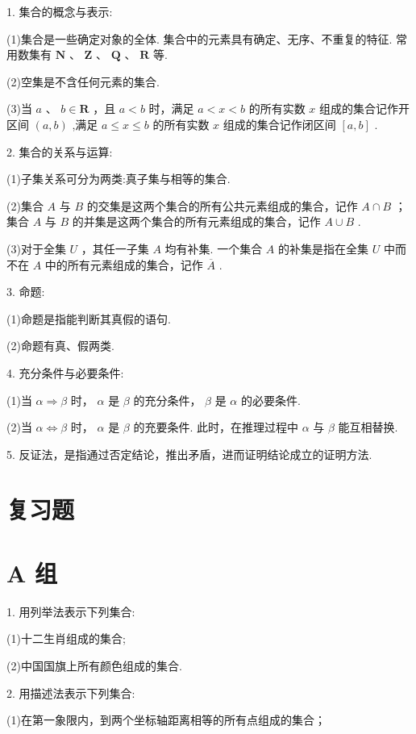 \documentclass[10pt]{article}
\begin{document}
1. 集合的概念与表示:

(1)集合是一些确定对象的全体. 集合中的元素具有确定、无序、不重复的特征. 常用数集有 \(\mathbf{N}\text{ 、 }\mathbf{Z}\text{ 、 }\mathbf{Q}\text{ 、 }\mathbf{R}\) 等.

(2)空集是不含任何元素的集合.

(3)当 \(a\text{ 、 }b \in  \mathbf{R}\) ，且 \(a < b\) 时，满足 \(a < x < b\) 的所有实数 \(x\) 组成的集合记作开区间 \(\left( {a,b}\right)\) ,满足 \(a \leq  x \leq  b\) 的所有实数 \(x\) 组成的集合记作闭区间 \(\left\lbrack  {a,b}\right\rbrack\) .

2. 集合的关系与运算:

(1)子集关系可分为两类:真子集与相等的集合.

(2)集合 \(A\) 与 \(B\) 的交集是这两个集合的所有公共元素组成的集合，记作 \(A \cap  B\) ；集合 \(A\) 与 \(B\) 的并集是这两个集合的所有元素组成的集合，记作 \(A \cup  B\) .

(3)对于全集 \(U\) ，其任一子集 \(A\) 均有补集. 一个集合 \(A\) 的补集是指在全集 \(U\) 中而不在 \(A\) 中的所有元素组成的集合，记作 \(\overline{A}\) .

3. 命题:

(1)命题是指能判断其真假的语句.

(2)命题有真、假两类.

4. 充分条件与必要条件:

(1)当 \(\alpha  \Rightarrow  \beta\) 时， \(\alpha\) 是 \(\beta\) 的充分条件， \(\beta\) 是 \(\alpha\) 的必要条件.

(2)当 \(\alpha  \Leftrightarrow  \beta\) 时， \(\alpha\) 是 \(\beta\) 的充要条件. 此时，在推理过程中 \(\alpha\) 与 \(\beta\) 能互相替换.

5. 反证法，是指通过否定结论，推出矛盾，进而证明结论成立的证明方法.

\section*{复习题}

\section*{A 组}

1. 用列举法表示下列集合:

(1)十二生肖组成的集合;

(2)中国国旗上所有颜色组成的集合.

2. 用描述法表示下列集合:

(1)在第一象限内，到两个坐标轴距离相等的所有点组成的集合；
\end{document}
